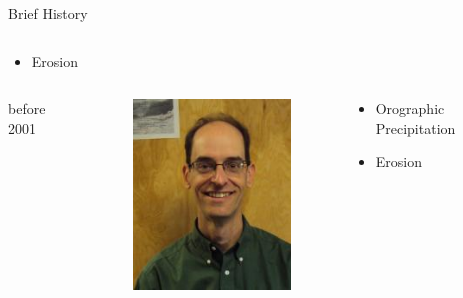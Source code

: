 \documentclass[hide notes,intlimits]{beamer}
\begin{document}
\begin{frame}{Brief History}
\begin{columns}[c]
\begin{column}{.55\linewidth}
\begin{itemize}
      \item Erosion
      \end{itemize}
    \end{column}
  \end{columns}  
  \begin{columns}
    \begin{column}{.1\linewidth}
      before 2001
    \end{column}
    \begin{column}{.1\linewidth}
      \begin{figure}
        \includegraphics[width=\textwidth]{ed_bueler}
      \end{figure}
    \end{column}
    \begin{column}{.55\linewidth}
      \begin{itemize}
      \item Orographic Precipitation
      \item Erosion
      \end{itemize}
    \end{column}
  \end{columns}  

\end{frame}
\end{document}
